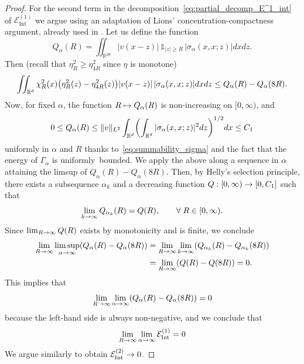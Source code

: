 \documentclass[AHL,Unicode,longabstracts,published]{cedram}
\DeclareMathOperator{\Intt}{Int}
\newcommand{\R}{\mathbb{R}}
\newcommand{\cE}{\mathcal{E}}
\newcommand{\1}{\mathds{1}}
\let\oldin\in
\renewcommand{\in}{\mathchoice{\oldin}{\oldin}{\,\oldin\,}{\,\oldin\,}}
\renewcommand*{\to}{\mathchoice{\longrightarrow}{\rightarrow}{\rightarrow}{\rightarrow}}
\let\oldmapsto\mapsto
\renewcommand*{\mapsto}{\mathchoice{\longmapsto}{\oldmapsto}{\oldmapsto}{\oldmapsto}}
\let\originalleft\left
\let\originalright\right
\renewcommand{\left}{\mathopen{}\mathclose\bgroup\originalleft}
\renewcommand{\right}{\aftergroup\egroup\originalright}
\let\oldforall\forall
\renewcommand*{\forall}{\mathrel{\oldforall}}
\begin{document}
\begin{proof}
For the second term in the decomposition~\eqref{eq:partial_decomp_E^1_int} of $\cE^{(1)}_{\Intt}$ we argue using an adaptation of Lions' concentration-compactness argument, already used in \cite[Lemma 4.8]{LewNamRou-14}. Let us define the function
\begin{equation*}
Q_\alpha(R)=\iint_{\R^{2d}} |v(x-z)|\,\1_{|z| \ge R}\, |\sigma_{\alpha}(x,x;z)|dxdz.
\end{equation*}
Then (recall that $\eta_R^2 \ge \eta_{4R}^2$ since $\eta$ is monotone)
\begin{equation*}
\iint_{\R^d} \chi_R^2(x)\left(\eta_R^2(z)- \eta_{4R}^2(z)\right)|v(x-z)|\,|\sigma_{\alpha}(x,x;z)|dxdz \le Q_\alpha(R)-Q_\alpha(8R).
\end{equation*}
Now, for fixed $\alpha$, the function $R\mapsto Q_\alpha(R)$ is non-increasing on $[0,\infty)$, and
\begin{equation*}
0\le Q_\alpha(R) \le \|v\|_{L^2} \int_{\R^d}\left(\int_{\R^d}|\sigma_\alpha(x,x;z)|^2dz \right)^{1/2}dx\le C_1
\end{equation*}
uniformly in $\alpha$ and $R$ thanks to~\eqref{eq:summability_sigma} and the fact that the energy of $\Gamma_\alpha$ is uniformly~bounded. We apply the above along a sequence in $\alpha$ attaining the limsup of $Q_\alpha (R) - Q_\alpha (8R)$. Then, by Helly's selection principle, there exists a subsequence $\alpha_k$ and a decreasing function $Q:[0,\infty)\to [0,C_1]$ such that
\begin{equation*}
\lim_{k\to\infty} Q_{\alpha_k}(R)=Q(R),\qquad\forall R \in[0,\infty).
\end{equation*}
Since $\lim_{R\to\infty} Q(R)$ exists by monotonicity and is finite, we conclude
\begin{align*}
\lim_{R \to\infty} \limsup_{\alpha \to \infty}\left(Q_{\alpha}(R)- Q_{\alpha}(8R) \right) &= \lim_{R \to\infty} \lim_{k \to \infty}\left(Q_{\alpha_k}(R)- Q_{\alpha_k}(8R) \right)\\
&=\lim_{R\to\infty}\left(Q(R)-Q(8R) \right)=0.
\end{align*}
This implies that
\[
\lim_{R \to\infty} \lim_{\alpha \to \infty}\left(Q_{\alpha}(R)- Q_{\alpha}(8R) \right) = 0
\]
because the left-hand side is always non-negative, and we conclude that
\begin{equation*}
\lim_{R \to\infty}\lim_{\alpha\to\infty}\cE^{(1)}_{\Intt}=0
\end{equation*}
We argue similarly to obtain $\cE_{\Intt}^{(2)} \to 0$.
\end{proof}
\end{document}
